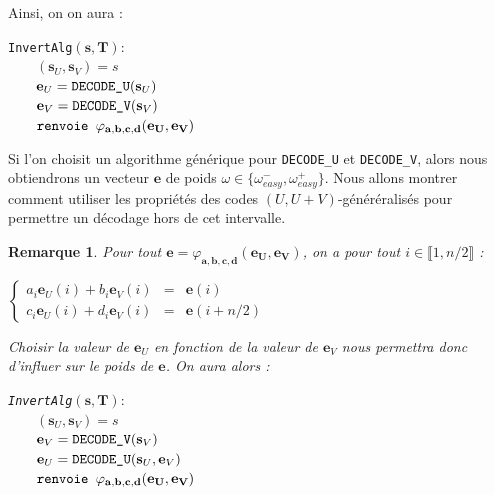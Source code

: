 \documentclass[12pt]{article}
\theoremstyle{plain}
\newtheorem{remarque}[thm]{Remarque}
\begin{document}
\noindent Ainsi, on on aura : \\
\begin{flushleft}
\leftskip=2cm
\verb|InvertAlg|$(\mathbf{s},\mathbf{T}) : $\\
$\qquad (\mathbf{s}_U, \mathbf{s}_V) = s $\\
$\qquad \mathbf{e}_U = \verb|DECODE_U|(\mathbf{s}_U) $\\
$\qquad \mathbf{e}_V = \verb|DECODE_V|(\mathbf{s}_V)$ \\
$\qquad \verb|renvoie | \varphi_{\mathbf{a},\mathbf{b},\mathbf{c},\mathbf{d}}(\mathbf{e_U},\mathbf{e_V})$ \\
\leftskip=0cm
\vspace{0.1in}

\end{flushleft}
Si l'on choisit un algorithme générique pour \verb|DECODE_U| et \verb|DECODE_V|, alors nous obtiendrons un vecteur $\mathbf{e}$ de poids $\omega \in \{\omega_{easy}^-,\omega_{easy}^+\}$. Nous allons montrer comment utiliser les propriétés des codes $(U,U+V)$-généréralisés pour permettre un décodage hors de cet intervalle. 

\begin{remarque} Pour tout $\mathbf{e} = \varphi_{\mathbf{a},\mathbf{b},\mathbf{c},\mathbf{d}}(\mathbf{e_U},\mathbf{e_V})$, on a pour tout $i \in \llbracket 1,n/2\rrbracket$ :
\begin{center}

$\left \{
\begin{array}{rcl}
a_i\mathbf{e}_U(i) + b_i\mathbf{e}_V(i) &=& \mathbf{e}(i) \\
c_i\mathbf{e}_U(i) + d_i\mathbf{e}_V(i) &=& \mathbf{e}(i+n/2) 
\end{array}
\right.$
\end{center}

\noindent Choisir la valeur de $\mathbf{e}_U$ en fonction de la valeur de $\mathbf{e}_V$ nous permettra donc d'influer sur le poids de $\mathbf{e}$. On aura alors :

\begin{flushleft}
\leftskip=2cm
\verb|InvertAlg|$(\mathbf{s},\mathbf{T}) : $\\
$\qquad (\mathbf{s}_U, \mathbf{s}_V) = s $\\
$\qquad \mathbf{e}_V = \verb|DECODE_V|(\mathbf{s}_V)$ \\
$\qquad \mathbf{e}_U = \verb|DECODE_U|(\mathbf{s}_U, \mathbf{e}_V) $\\
$\qquad \verb|renvoie | \varphi_{\mathbf{a},\mathbf{b},\mathbf{c},\mathbf{d}}(\mathbf{e_U},\mathbf{e_V})$ \\
\leftskip=0cm
\vspace{0.1in}
\end{flushleft}

\end{remarque}
\end{document}

